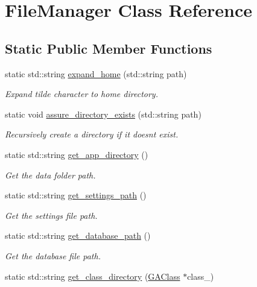 \hypertarget{class_file_manager}{}\section{File\+Manager Class Reference}
\label{class_file_manager}
\subsection*{Static Public Member Functions}
\begin{DoxyCompactItemize}
\item 
static std\+::string \hyperlink{class_file_manager_a129c4b18fe9f4ebff19c4e15ed6b18ba}{expand\+\_\+home} (std\+::string path)
\begin{DoxyCompactList}\small\item\em Expand tilde character to home directory. \end{DoxyCompactList}\item 
static void \hyperlink{class_file_manager_a83cfd6d81f7e28b3e3a0ce2c0304f4d7}{assure\+\_\+directory\+\_\+exists} (std\+::string path)
\begin{DoxyCompactList}\small\item\em Recursively create a directory if it doesn\textquotesingle{}t exist. \end{DoxyCompactList}\item 
static std\+::string \hyperlink{class_file_manager_adcdb52224d9e277f6be2a971ed92ea85}{get\+\_\+app\+\_\+directory} ()
\begin{DoxyCompactList}\small\item\em Get the data folder path. \end{DoxyCompactList}\item 
static std\+::string \hyperlink{class_file_manager_af358077bb6e0d2db9c772f0bdd247207}{get\+\_\+settings\+\_\+path} ()
\begin{DoxyCompactList}\small\item\em Get the settings file path. \end{DoxyCompactList}\item 
static std\+::string \hyperlink{class_file_manager_a4c028190b9434dc2bd3b467af1e3b2ed}{get\+\_\+database\+\_\+path} ()
\begin{DoxyCompactList}\small\item\em Get the database file path. \end{DoxyCompactList}\item 
static std\+::string \hyperlink{class_file_manager_a6906ae61830e4ae2f9ebd06ece9beeb4}{get\+\_\+class\+\_\+directory} (\hyperlink{class_g_a_class}{G\+A\+Class} $\ast$class\+\_\+)

\end{DoxyCompactItemize}
